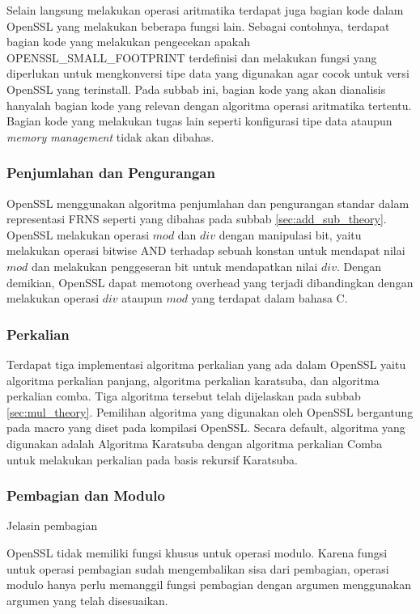 Selain langsung melakukan operasi aritmatika terdapat juga bagian kode dalam OpenSSL yang melakukan beberapa fungsi lain. Sebagai contohnya, terdapat bagian kode yang melakukan pengecekan apakah OPENSSL\_SMALL\_FOOTPRINT terdefinisi dan melakukan fungsi yang diperlukan untuk mengkonversi tipe data yang digunakan agar cocok untuk versi OpenSSL yang terinstall. Pada subbab ini, bagian kode yang akan dianalisis hanyalah bagian kode yang relevan dengan algoritma operasi aritmatika tertentu. Bagian kode yang melakukan tugas lain seperti konfigurasi tipe data ataupun \textit{memory management} tidak akan dibahas.

\subsubsection{Penjumlahan dan Pengurangan}
OpenSSL menggunakan algoritma penjumlahan dan pengurangan standar dalam representasi FRNS seperti yang dibahas pada subbab \ref{sec:add_sub_theory}. OpenSSL melakukan operasi $mod$ dan $div$ dengan manipulasi bit, yaitu melakukan operasi bitwise AND terhadap sebuah konstan untuk mendapat nilai $mod$ dan melakukan penggeseran bit untuk mendapatkan nilai $div$. Dengan demikian, OpenSSL dapat memotong overhead yang terjadi dibandingkan dengan melakukan operasi $div$ ataupun $mod$ yang terdapat dalam bahasa C.

\subsubsection{Perkalian}
Terdapat tiga implementasi algoritma perkalian yang ada dalam OpenSSL yaitu algoritma perkalian panjang, algoritma perkalian karatsuba, dan algoritma perkalian comba. Tiga algoritma tersebut telah dijelaskan pada subbab \ref{sec:mul_theory}. Pemilihan algoritma yang digunakan oleh OpenSSL bergantung pada macro yang diset pada kompilasi OpenSSL. Secara default, algoritma yang digunakan adalah Algoritma Karatsuba dengan algoritma perkalian Comba untuk melakukan perkalian pada basis rekursif Karatsuba.

\subsubsection{Pembagian dan Modulo}
Jelasin pembagian

OpenSSL tidak memiliki fungsi khusus untuk operasi modulo. Karena fungsi untuk operasi pembagian sudah mengembalikan sisa dari pembagian, operasi modulo hanya perlu memanggil fungsi pembagian dengan argumen menggunakan argumen yang telah disesuaikan.
